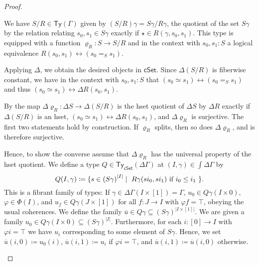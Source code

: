 \documentclass[10pt,a4paper]{article}
\theoremstyle{definition}
\theoremstyle{remark}
\newcommand{\cSet}{\mathsf{cSet}}
\newcommand\Ty{\mathsf{Ty}}
\DeclarePairedDelimiter\set{\{}{\}}
\begin{document}
\begin{proof}
  \begin{description}[font=\normalfont,leftmargin=0cm]
  \item[\ref{prop:set-quotient-is-hset-quotient-iff-surjection-splits:well-defined}] 
    We have \(S/R \in \Ty(\Gamma)\) given by \((S/R)\gamma = S\gamma / R\gamma\), the quotient of the set \(S\gamma\) by the relation relating \(s_0, s_1 \in S\gamma\) exactly if \(\star \in R(\gamma, s_0, s_1)\).
    This type is equipped with a function \(\varrho_R \colon S \to S/R\) and in the context with \(s_0, s_1 \colon S\) a logical equivalence \(R(s_0, s_1) \leftrightarrow (s_0 =_S s_1)\).

    Applying \(\Delta\), we obtain the desired objects in \(\cSet\).
    Since \(\Delta(S/R)\) is fiberwise constant, we have in the context with \(s_0, s_1 \colon S\) that \((s_0 \simeq s_1) \leftrightarrow (s_0 =_S s_1)\) and thus \((s_0 \simeq s_1) \leftrightarrow \Delta R(s_0, s_1)\).
  \item[\ref{prop:set-quotient-is-hset-quotient-iff-surjection-splits:characterization}] %
    By \cite[Theorem 18.2.3]{rijke2025intro} the map \(\Delta \varrho_{R} \colon \Delta S \to \Delta(S/R)\) is the hset quotient of \(\Delta S\) by \(\Delta R\) exactly if \(\Delta(S/R)\) is an hset, \((s_0 \simeq s_1) \leftrightarrow \Delta R(s_0, s_1)\), and \(\Delta \varrho_{R}\) is surjective.
    The first two statements hold by construction.
    If \(\varrho_R\) splits, then so does \(\Delta \varrho_{R}\), and is therefore surjective.

    Hence, to show the converse assume that \(\Delta \varrho_{R}\) has the universal property of the hset quotient.
    We define a type \(Q \in \Ty_{\cSet}(\Delta\Gamma)\) at \((I, \gamma) \in \int\Delta\Gamma\) by
    \[
      Q(I, \gamma) \coloneqq \set{ s \in {(S\gamma)}^{|I|} \mid \text{ \(R\gamma(si_0, si_1)\) if \(i_0 \leq i_1\) } }.
    \]
    This is a fibrant family of types: If \(\gamma \in \Delta\Gamma(I \times [1]) = \Gamma\), \(u_0 \in Q\gamma(I \times 0)\), \(\varphi \in \Phi(I)\), and \(u_f \in Q\gamma(J \times [1])\) for all \(f \colon J \to I\) with \(\varphi f = \top\), obeying the usual coherences.
    We define the family \(\overline u \in Q\gamma \subseteq {(S\gamma)}^{|I \times [1]|}\).
    We are given a family \(u_0 \in Q\gamma(I \times 0) \subseteq {(S\gamma)}^{|I|}\).
    Furthermore, for each \(i \colon [0] \to I\) with \(\varphi i = \top\) we have \(u_i\) corresponding to some element of \(S\gamma\).
    Hence, we set \(\overline u(i, 0) \coloneqq u_0(i)\), \(\overline u(i, 1) \coloneqq u_i\) if \(\varphi i = \top\), and \(\overline u(i, 1) \coloneqq \overline u(i, 0)\) otherwise.


\end{description}
\end{proof}
\end{document}
